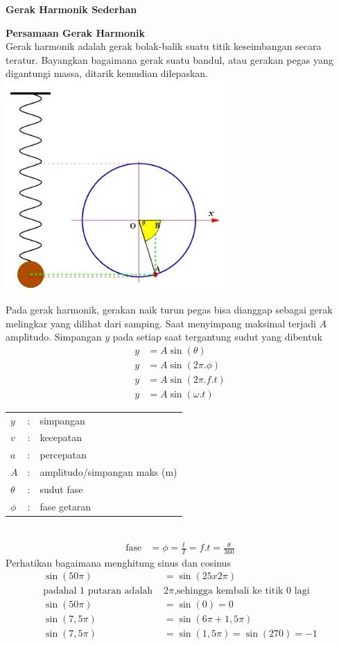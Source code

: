 \documentclass[10pt,a4paper]{extarticle}
\begin{document}
 \textbf{Gerak Harmonik Sederhan} \phantom{ini nama siswa yang aaamengerjakan soal kuis ini }  

\begin{multicols*}{2}
\textbf{Persamaan Gerak Harmonik}\\
Gerak harmonik adalah gerak bolak-balik suatu titik keseimbangan secara teratur. Bayangkan bagaimana gerak suatu bandul, atau gerakan pegas yang digantungi massa, ditarik kemudian dilepaskan.\\
\includegraphics[height=8cm]{pic/kuis-ghs1}

Pada gerak harmonik, gerakan naik turun pegas bisa dianggap sebagai gerak melingkar yang dilihat dari samping. Saat menyimpang maksimal terjadi $A$ amplitudo. Simpangan $y$ pada setiap saat tergantung sudut yang dibentuk
\begin{align*}
y&=A\sin(\theta)\\
y&=A\sin(2\pi.\phi)\\
y&=A\sin(2\pi.f.t)\\
y&=A\sin(\omega.t)
\end{align*}
\setlength{\tabcolsep}{0.1\tabcolsep}

\begin{tabular}{p{0.5cm} p{1mm} p{6cm}}
$y$ &:& simpangan \\
$v$ &:& kecepatan \\
$a$ &:& percepatan \\
$A$ &:& amplitudo/simpangan maks (m)\\
$\theta$&:& sudut fase\\
$\phi$&:& fase getaran
\end{tabular}\\
\begin{align*}
\text{fase} &= \phi = \frac{t}{T}=f.t=\frac{\theta}{360}
\end{align*}
Perhatikan bagaimana menghitung sinus dan cosinus
\begin{align*}
\sin(50\pi) &= \sin(25x2\pi)\\
\text{padahal 1 putaran adalah }&2\pi\text{,sehingga kembali ke titik 0 lagi}\\
\sin(50\pi) &= \sin (0) = 0\\
\sin(7,5\pi) &= \sin (6\pi + 1,5\pi)\\
\sin(7,5\pi) &= \sin (1,5\pi) = \sin (270) = -1
\end{align*}


\end{multicols*}
\end{document}
